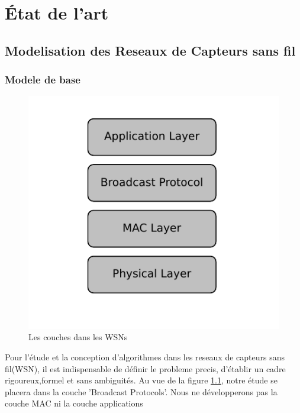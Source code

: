 
\chapter{État de l'art}\label{etat_art}




\section{Modelisation des Reseaux de Capteurs sans fil}

\subsection{Modele de base}

\begin{figure}[h]
\centering
\includegraphics[scale=0.9]{Etat_de_l'art/source/layer.pdf}
\caption{\label{Layer} Les couches dans les WSNs}
\end{figure}

Pour l'étude et la conception d'algorithmes dans les reseaux de capteurs sans fil(WSN), il est indispensable de définir le probleme precis, d'établir un cadre rigoureux,formel et sans ambiguités. Au vue de la figure \ref{Layer}, notre étude se 
placera dans la couche 'Broadcast Protocols'. Nous ne développerons pas la couche MAC ni la couche applications\\

